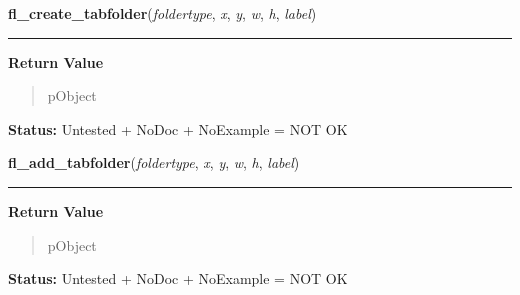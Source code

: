     \vspace{0.5ex}

\hspace{.8\funcindent}\begin{boxedminipage}{\funcwidth}

    \raggedright \textbf{fl\_create\_tabfolder}(\textit{foldertype}, \textit{x}, \textit{y}, \textit{w}, \textit{h}, \textit{label})

    \vspace{-1.5ex}

    \rule{\textwidth}{0.5\fboxrule}
\setlength{\parskip}{2ex}
\setlength{\parskip}{1ex}
      \textbf{Return Value}
    \vspace{-1ex}

      \begin{quote}
      pObject

      \end{quote}

\textbf{Status:} Untested + NoDoc + NoExample = NOT OK



    \end{boxedminipage}

    \label{xformslib:library:fl_add_tabfolder}

    \vspace{0.5ex}

\hspace{.8\funcindent}\begin{boxedminipage}{\funcwidth}

    \raggedright \textbf{fl\_add\_tabfolder}(\textit{foldertype}, \textit{x}, \textit{y}, \textit{w}, \textit{h}, \textit{label})

    \vspace{-1.5ex}

    \rule{\textwidth}{0.5\fboxrule}
\setlength{\parskip}{2ex}
\setlength{\parskip}{1ex}
      \textbf{Return Value}
    \vspace{-1ex}

      \begin{quote}
      pObject

      \end{quote}

\textbf{Status:} Untested + NoDoc + NoExample = NOT OK



    \end{boxedminipage}

